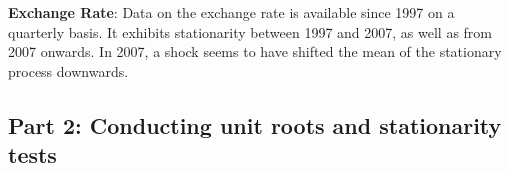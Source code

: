 \documentclass[
]{article}
\begin{document}
\textbf{Exchange Rate}: Data on the exchange rate is available since
1997 on a quarterly basis. It exhibits stationarity between 1997 and
2007, as well as from 2007 onwards. In 2007, a shock seems to have
shifted the mean of the stationary process downwards.

\subsection*{Part 2: Conducting unit roots and stationarity tests}
\end{document}

